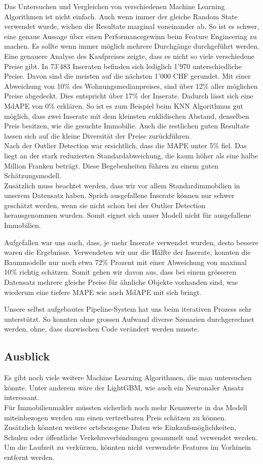 Das Untersuchen und Vergleichen von verschiedenen Machine Learning Algorithmen ist nicht einfach. Auch wenn immer der gleiche Random State verwendet wurde, wichen die Resultate marginal voneinander ab. So ist es schwer, eine genaue Aussage über einen Performancegewinn beim Feature Engineering zu machen. Es sollte wenn immer möglich mehrere Durchgänge durchgeführt werden.\\
Eine genauere Analyse des Kaufpreises zeigte, dass es nicht so viele verschiedene Preise gibt. In 73'483 Inseraten befinden sich lediglich 1'970 unterschiedliche Preise. Davon sind die meisten auf die nächsten 1'000 CHF gerundet. Mit einer Abweichung von 10\% des Wohnungsmedianpreises, sind über 12\% aller möglichen Preise abgedeckt. Dies entspricht über 17\% der Inserate. Dadurch lässt sich eine MdAPE von 0\% erklären. So ist es zum Beispiel beim KNN Algorithmus gut möglich, dass zwei Inserate mit dem kleinsten euklidischen Abstand, denselben Preis besitzen, wie die gesuchte Immobilie. Auch die restlichen guten Resultate lassen sich auf die kleine Diversität der Preise zurückführen.\\
Nach der Outlier Detection war ersichtlich, dass die MAPE unter 5\% fiel. Das liegt an der stark reduzierten Standardabweichung, die kaum höher als eine halbe Million Franken beträgt. Diese Begebenheiten führen zu einem guten Schätzungsmodell.\\
Zusätzlich muss beachtet werden, dass wir vor allem Standardimmobilien in unserem Datensatz haben. Sprich ausgefallene Inserate können nur schwer geschätzt werden, wenn sie nicht schon bei der Outlier Detection herausgenommen wurden. Somit eignet sich unser Modell nicht für ausgefallene Immobilien.

Aufgefallen war uns auch, dass, je mehr Inserate verwendet wurden, desto bessere waren die Ergebnisse. Verwendeten wir nur die Hälfte der Inserate, konnten die Baummodelle nur noch etwa 72\% Prozent mit einer Abweichung von maximal 10\% richtig schätzen. Somit gehen wir davon aus, dass bei einem grösseren Datensatz mehrere gleiche Preise für ähnliche Objekte vorhanden sind, was wiederum eine tiefere MAPE wie auch MdAPE mit sich bringt.

Unsere selbst aufgebautes Pipeline-System hat uns beim iterativen Prozess sehr unterstützt. So konnten ohne grossen Aufwand diverse Szenarien durchgerechnet werden, ohne, dass dazwischen Code verändert werden musste.
%
\subsection{Ausblick}
Es gibt noch viele weitere Machine Learning Algorithmen, die man untersuchen könnte. Unter anderem wäre der LightGBM, wie auch ein Neuronaler Ansatz interessant.\\
Für Immobilienmakler müssten sicherlich noch mehr Kennwerte in das Modell miteinbezogen werden um einen vertretbaren Preis schätzen zu können. Zusätzlich könnten weitere ortsbezogene Daten wie Einkaufsmöglichkeiten, Schulen oder öffentliche Verkehrsverbindungen gesammelt und verwendet werden.\\
Um die Laufzeit zu verkürzen, könnten nicht verwendete Features im Vorhinein entfernt werden.
